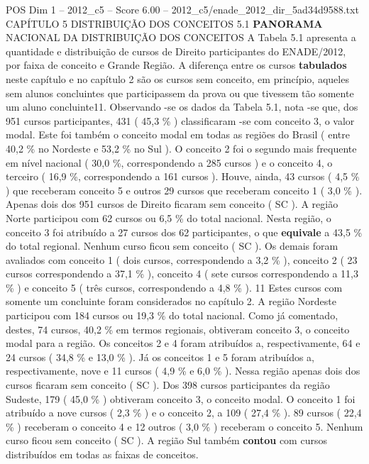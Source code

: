 \begin{textsample}{POS Dim 1 – 2012\_c5 – Score 6.00 – 2012\_c5/enade\_2012\_dir\_5ad34d9588.txt}  \label{ex:f1_pos_118}
CAPÍTULO 5 DISTRIBUIÇÃO DOS CONCEITOS 5.1 \textbf{PANORAMA} NACIONAL DA DISTRIBUIÇÃO DOS CONCEITOS A Tabela 5.1 apresenta a quantidade e distribuição de cursos de Direito participantes do ENADE/2012, por faixa de conceito e Grande Região.
A diferença entre os cursos \textbf{tabulados} neste capítulo e no capítulo 2 são os cursos sem conceito, em princípio, aqueles sem alunos concluintes que participassem da prova ou que tivessem tão somente um aluno concluinte11.
Observando -se os dados da Tabela 5.1, nota -se que, dos 951 cursos participantes, 431 ( 45,3 \% ) classificaram -se com conceito 3, o valor modal.
Este foi também o conceito modal em todas as regiões do Brasil ( entre 40,2 \% no Nordeste e 53,2 \% no Sul ).
O conceito 2 foi o segundo mais frequente em nível nacional ( 30,0 \%, correspondendo a 285 cursos ) e o conceito 4, o terceiro ( 16,9 \%, correspondendo a 161 cursos ).
Houve, ainda, 43 cursos ( 4,5 \% ) que receberam conceito 5 e outros 29 cursos que receberam conceito 1 ( 3,0 \% ).
Apenas dois dos 951 cursos de Direito ficaram sem conceito ( SC ).
A região Norte participou com 62 cursos ou 6,5 \% do total nacional.
Nesta região, o conceito 3 foi atribuído a 27 cursos dos 62 participantes, o que \textbf{equivale} a 43,5 \% do total regional.
Nenhum curso ficou sem conceito ( SC ).
Os demais foram avaliados com conceito 1 ( dois cursos, correspondendo a 3,2 \% ), conceito 2 ( 23 cursos correspondendo a 37,1 \% ), conceito 4 ( sete cursos correspondendo a 11,3 \% ) e conceito 5 ( três cursos, correspondendo a 4,8 \% ). 11 Estes cursos com somente um concluinte foram considerados no capítulo 2.
A região Nordeste participou com 184 cursos ou 19,3 \% do total nacional.
Como já comentado, destes, 74 cursos, 40,2 \% em termos regionais, obtiveram conceito 3, o conceito modal para a região.
Os conceitos 2 e 4 foram atribuídos a, respectivamente, 64 e 24 cursos ( 34,8 \% e 13,0 \% ).
Já os conceitos 1 e 5 foram atribuídos a, respectivamente, nove e 11 cursos ( 4,9 \% e 6,0 \% ).
Nessa região apenas dois dos cursos ficaram sem conceito ( SC ).
Dos 398 cursos participantes da região Sudeste, 179 ( 45,0 \% ) obtiveram conceito 3, o conceito modal.
O conceito 1 foi atribuído a nove cursos ( 2,3 \% ) e o conceito 2, a 109 ( 27,4 \% ). 89 cursos ( 22,4 \% ) receberam o conceito 4 e 12 outros ( 3,0 \% ) receberam o conceito 5.
Nenhum curso ficou sem conceito ( SC ).
A região Sul também \textbf{contou} com cursos distribuídos em todas as faixas de conceitos.

\end{textsample}
